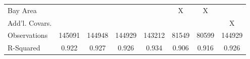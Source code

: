 {\begin{tabular}{l*{7}{c}}
Bay Area            &               &               &               &               &           X   &           X   &               \\
Add'l. Covars.      &               &               &               &               &               &               &           X   \\
Observations        &      145091   &      144948   &      144929   &      143212   &       81549   &       80599   &      144929   \\
R-Squared           &       0.922   &       0.927   &       0.926   &       0.934   &       0.906   &       0.916   &       0.926   \\
\bottomrule
\end{tabular}
}
